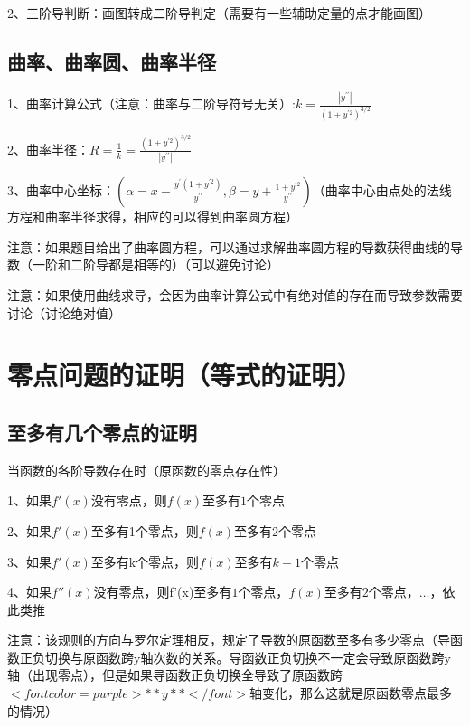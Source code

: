 2、三阶导判断：画图转成二阶导判定（需要有一些辅助定量的点才能画图）



\subsection{曲率、曲率圆、曲率半径}

1、曲率计算公式（注意：曲率与二阶导符号无关）:$ k=\frac{\left|y^{\prime \prime}\right|}{\left(1+y^{\prime 2}\right)^{3 / 2}} $

2、曲率半径：$ R=\frac{1}{k}=\frac{\left(1+y^{\prime 2}\right)^{3 / 2}}{\left|y^{\prime \prime}\right|} $

3、曲率中心坐标：$ (\alpha=x-\frac{y^{\prime}\left(1+y^{\prime 2}\right)}{y^{\prime \prime}}, \beta=y+\frac{1+y^{\prime 2}}{y^{\prime \prime}}) $（曲率中心由点处的法线方程和曲率半径求得，相应的可以得到曲率圆方程）

注意：如果题目给出了曲率圆方程，可以通过求解曲率圆方程的导数获得曲线的导数（一阶和二阶导都是相等的）（可以避免讨论）

注意：如果使用曲线求导，会因为曲率计算公式中有绝对值的存在而导致参数需要讨论（讨论绝对值）



\section{零点问题的证明（等式的证明）}



\subsection{至多有几个零点的证明}

当函数的各阶导数存在时（原函数的零点存在性）

1、如果$ f'(x) $没有零点，则$ f(x) $至多有$ 1 $个零点

2、如果$ f'(x) $至多有1个零点，则$ f(x) $至多有$ 2 $个零点

3、如果$ f'(x) $至多有k个零点，则$ f(x) $至多有$ k+1 $个零点

4、如果$ f''(x) $没有零点，则f'(x)至多有$ 1 $个零点，$ f(x) $至多有$ 2 $个零点，$ … $，依此类推

注意：该规则的方向与罗尔定理相反，规定了导数的原函数至多有多少零点（导函数正负切换与原函数跨y轴次数的关系。导函数正负切换不一定会导致原函数跨y轴（出现零点），但是如果导函数正负切换全导致了原函数跨$ <font color=purple>**y**</font> $轴变化，那么这就是原函数零点最多的情况）



